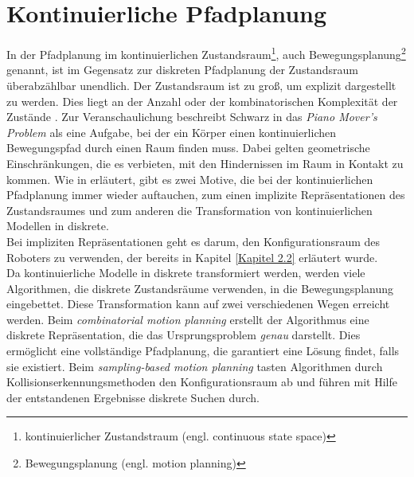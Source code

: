 \section{Kontinuierliche Pfadplanung} \label{Kapitel 3.4}
In der Pfadplanung im kontinuierlichen Zustandsraum\footnote{kontinuierlicher Zustandstraum (engl. continuous state space)}, auch Bewegungsplanung\footnote{Bewegungsplanung (engl. motion planning)} genannt, ist im Gegensatz zur diskreten Pfadplanung der Zustandsraum überabzählbar unendlich.  Der Zustandsraum ist zu groß, um explizit dargestellt zu werden. Dies liegt an der Anzahl oder der kombinatorischen Komplexität der Zustände \cite[~S. 17]{Lav06}.
Zur Veranschaulichung beschreibt Schwarz in \cite{Schw:83} das \textit{Piano Mover's Problem} als eine Aufgabe, bei der ein Körper einen kontinuierlichen Bewegungspfad durch einen Raum finden muss. Dabei gelten geometrische Einschränkungen, die es verbieten, mit den Hindernissen im Raum in Kontakt zu kommen.
Wie in \cite[~S. 79 f.]{Lav06} erläutert, gibt es zwei Motive, die bei der kontinuierlichen Pfadplanung immer wieder auftauchen, zum einen implizite Repräsentationen des Zustandsraumes und zum anderen die Transformation von kontinuierlichen Modellen in diskrete.\\
Bei impliziten Repräsentationen geht es darum, den Konfigurationsraum des Roboters zu verwenden, der bereits in Kapitel \ref{Kapitel 2.2} erläutert wurde.\\
Da kontinuierliche Modelle in diskrete transformiert werden, werden viele Algorithmen, die diskrete Zustandsräume verwenden, in die Bewegungsplanung eingebettet. Diese Transformation kann auf zwei verschiedenen Wegen erreicht werden. Beim \textit{combinatorial motion planning} erstellt der Algorithmus eine diskrete Repräsentation, die das Ursprungsproblem \textit{genau} darstellt. Dies ermöglicht eine vollständige Pfadplanung, die garantiert eine Lösung findet, falls sie existiert. Beim \textit{sampling-based motion planning} tasten Algorithmen durch Kollisionserkennungsmethoden den Konfigurationsraum ab und führen mit Hilfe der entstandenen Ergebnisse diskrete Suchen durch.


%
%

